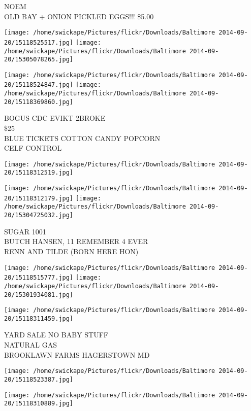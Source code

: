 \documentclass[10pt,letterpaper]{article}
\begin{document}
NOEM\\
OLD BAY + ONION PICKLED EGGS!!! \$5.00
\pagebreak

\texttt{[image: /home/swickape/Pictures/flickr/Downloads/Baltimore 2014-09-20/15118525517.jpg]}
\texttt{[image: /home/swickape/Pictures/flickr/Downloads/Baltimore 2014-09-20/15305078265.jpg]}

\texttt{[image: /home/swickape/Pictures/flickr/Downloads/Baltimore 2014-09-20/15118524847.jpg]}
\texttt{[image: /home/swickape/Pictures/flickr/Downloads/Baltimore 2014-09-20/15118369860.jpg]}

BOGUS CDC EVIKT 2BROKE\\
\$25\\
BLUE TICKETS COTTON CANDY POPCORN\\
CELF CONTROL
\pagebreak

\texttt{[image: /home/swickape/Pictures/flickr/Downloads/Baltimore 2014-09-20/15118312519.jpg]}

\vspace{0.25in}
\texttt{[image: /home/swickape/Pictures/flickr/Downloads/Baltimore 2014-09-20/15118312179.jpg]}
\texttt{[image: /home/swickape/Pictures/flickr/Downloads/Baltimore 2014-09-20/15304725032.jpg]}

SUGAR 1001\\
BUTCH HANSEN, 11 REMEMBER 4 EVER\\
RENN AND TILDE (BORN HERE HON)
\pagebreak

\texttt{[image: /home/swickape/Pictures/flickr/Downloads/Baltimore 2014-09-20/15118515777.jpg]}
\texttt{[image: /home/swickape/Pictures/flickr/Downloads/Baltimore 2014-09-20/15301934081.jpg]}

\vspace{0.25in}
\texttt{[image: /home/swickape/Pictures/flickr/Downloads/Baltimore 2014-09-20/15118311459.jpg]}

YARD SALE NO BABY STUFF\\
NATURAL GAS\\
BROOKLAWN FARMS HAGERSTOWN MD
\pagebreak

\texttt{[image: /home/swickape/Pictures/flickr/Downloads/Baltimore 2014-09-20/15118523387.jpg]}

\vspace{0.25in}
\texttt{[image: /home/swickape/Pictures/flickr/Downloads/Baltimore 2014-09-20/15118310889.jpg]}
\end{document}
